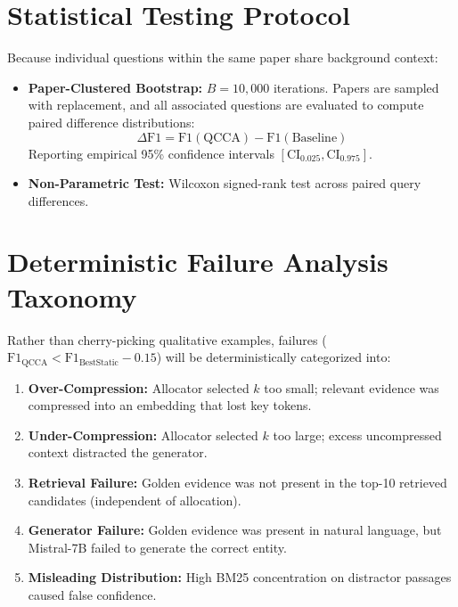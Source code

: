 \documentclass[11pt,a4paper]{article}
\begin{document}
\section{Statistical Testing Protocol}
Because individual questions within the same paper share background context:
\begin{itemize}
    \item \textbf{Paper-Clustered Bootstrap:} $B = 10{,}000$ iterations. Papers are sampled with replacement, and all associated questions are evaluated to compute paired difference distributions:
    \begin{equation}
    \Delta \text{F1} = \text{F1}(\text{QCCA}) - \text{F1}(\text{Baseline})
    \end{equation}
    Reporting empirical 95\% confidence intervals $[\text{CI}_{0.025}, \text{CI}_{0.975}]$.
    \item \textbf{Non-Parametric Test:} Wilcoxon signed-rank test across paired query differences.
\end{itemize}

\section{Deterministic Failure Analysis Taxonomy}
Rather than cherry-picking qualitative examples, failures ($\text{F1}_{\text{QCCA}} < \text{F1}_{\text{BestStatic}} - 0.15$) will be deterministically categorized into:
\begin{enumerate}
    \item \textbf{Over-Compression:} Allocator selected $k$ too small; relevant evidence was compressed into an embedding that lost key tokens.
    \item \textbf{Under-Compression:} Allocator selected $k$ too large; excess uncompressed context distracted the generator.
    \item \textbf{Retrieval Failure:} Golden evidence was not present in the top-10 retrieved candidates (independent of allocation).
    \item \textbf{Generator Failure:} Golden evidence was present in natural language, but Mistral-7B failed to generate the correct entity.
    \item \textbf{Misleading Distribution:} High BM25 concentration on distractor passages caused false confidence.
\end{enumerate}
\end{document}
